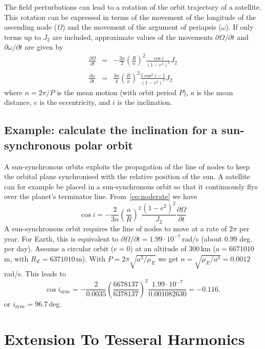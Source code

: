 \documentclass[a4paper]{article}
\begin{document}
The field perturbations can lead to a rotation of the orbit trajectory of a satellite. This rotation can be expressed in terms of the movement of the longitude of the ascending node ($\Omega$) and the movement of the argument of periapsis ($\omega$).
If only terms up to $J_2$ are included, approximate values of the movements $\partial\Omega/\partial t$ and $\partial\omega/\partial t$ are given by
\begin{eqnarray}
\frac{\partial\Omega}{\partial t} &=& -\frac{3 n}{2} \left(\frac{R}{a}\right)^2 \frac{\cos i}{(1-e^2)^2} J_2 \label{eq:noderate} \\
\frac{\partial\omega}{\partial t} &=& \frac{3 n}{4} \left(\frac{R}{a}\right)^2 \frac{5 \cos^2 i - 1}{(1-e^2)^2} J_2
\end{eqnarray}
where $n=2\pi/P$ is the mean motion (with orbit period $P$), $a$ is the mean distance, $e$ is the eccentricity, and $i$ is the inclination.

\subsection*{Example: calculate the inclination for a sun-synchronous polar orbit}
A sun-synchronous orbits exploits the propagation of the line of nodes to keep the orbital plane synchronised with the relative position of the sun. A satellite can for example be placed in a sun-synchronous orbit so that it continuously flys over the planet's terminator line.
From~\ref{eq:noderate} we have
\begin{equation}
\cos i = -\frac{2}{3 n} \left(\frac{a}{R} \right)^2 \frac{(1-e^2)^2}{J_2} \frac{\partial\Omega}{\partial t}
\end{equation}
A sun-synchronous orbit requires the line of nodes to move at a rate of $2\pi$ per year. For Earth, this is equivalent to $\partial\Omega/\partial t = 1.99\cdot 10^{-7}$\,rad/s (about $0.99$ deg. per day). Assume a circular orbit ($e=0$) at an altitude of 300\,km
($a = 6 671 010$\,m, with $R_E = 6 371 010$\,m).
With $P = 2\pi\sqrt{a^3/\mu_E}$ we get $n = \sqrt{\mu_E/a^3} = 0.0012$\,rad/s. This leads to
\begin{equation}
\cos i_\text{sync} = -\frac{2}{0.0035} \left(\frac{6 678 137}{6 378 137}\right)^2 \frac{1.99\cdot 10^{-7}}{0.001082630} = -0.116,
\end{equation}
or $i_\text{sync} = 96.7$\,deg.
\section{Extension To Tesseral Harmonics}
\end{document}
